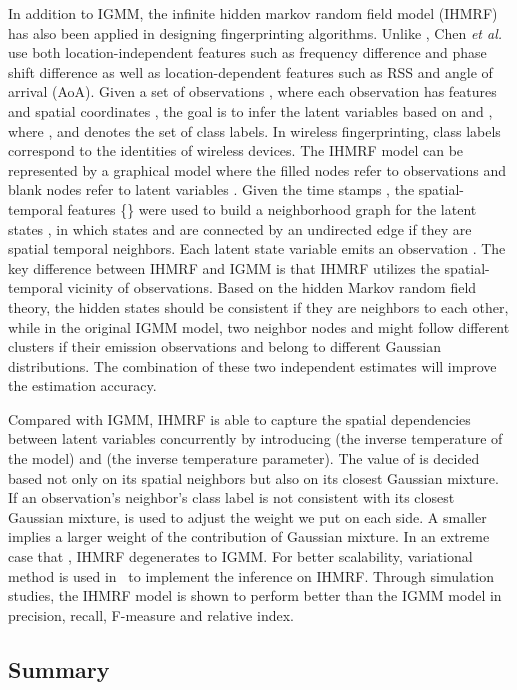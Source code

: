 \documentclass[journal,draftcls,onecolumn,11pt]{IEEEtran}
\begin{document}
In addition to IGMM, the infinite hidden markov random field model (IHMRF) has also been applied in designing fingerprinting algorithms\cite{Chen}. Unlike \cite{Nguyen2011}, Chen {\it et al.}~\cite{Chen} use both location-independent features such as frequency difference and phase shift difference as well as location-dependent features such as RSS and angle of arrival (AoA). Given a set of observations {}, where each observation  has  features  and  spatial coordinates , the goal is to infer the latent variables  based on  and , where , and  denotes the set of class labels. In wireless fingerprinting, class labels correspond to the identities of wireless devices. The IHMRF model can be represented by a graphical model where the filled nodes refer to observations and blank nodes refer to latent variables . Given the time stamps , the spatial-temporal features \{\} were used to build a neighborhood graph for the latent states , in which states  and  are connected by an undirected edge if they are spatial temporal neighbors. Each latent state variable  emits an observation . The key difference between IHMRF and IGMM is that IHMRF utilizes the spatial-temporal vicinity of observations. Based on the hidden Markov random field theory, the hidden states should be consistent if they are neighbors to each other, while in the original IGMM model, two neighbor nodes  and  might follow different clusters if their emission observations  and  belong to different Gaussian distributions. The combination of these two independent estimates will improve the estimation accuracy. 

Compared with IGMM, IHMRF is able to capture the spatial dependencies between latent variables  concurrently by introducing  (the inverse temperature of the model) and  (the inverse temperature parameter). The value of  is decided based not only on its spatial neighbors but also on its closest Gaussian mixture. If an observation's neighbor's class label is not consistent with its closest Gaussian mixture,  is used to adjust the weight we put on each side. A smaller  implies a larger weight of the contribution of Gaussian mixture. In an extreme case that , IHMRF degenerates to IGMM. For better scalability, variational method is used in~\cite{Chen} to implement the inference on IHMRF. Through simulation studies, the IHMRF model is shown to perform better than the IGMM model in precision, recall, F-measure and relative index.

\subsection{Summary}
\end{document}
